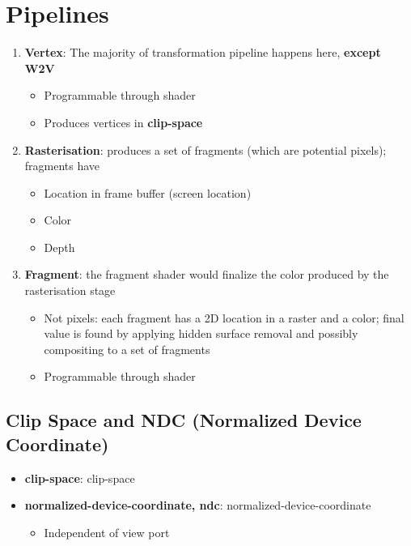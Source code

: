 \chapter{Pipelines}\label{chapter: pipelines}

\begin{enumerate}
  \item \textbf{Vertex}: The majority of transformation pipeline happens here,
  \textbf{except W2V}
  \begin{itemize}
    \item Programmable through shader
    \item Produces vertices in \textbf{\gls{clip-space}}
  \end{itemize}

  \item \textbf{Rasterisation}: produces a set of fragments (which are
  potential pixels); fragments have
  \begin{itemize}
    \item Location in frame buffer (screen location)
    \item Color
    \item Depth
  \end{itemize}

  \item \textbf{Fragment}: the fragment shader would finalize the color
  produced by the rasterisation stage
  \begin{itemize}
    \item Not pixels: each fragment has a 2D location in a raster and a color;
    final value is found by applying hidden surface removal and possibly
    compositing to a set of fragments
    \item Programmable through shader
  \end{itemize}
\end{enumerate}

\section{Clip Space and NDC (Normalized Device Coordinate)}

  \begin{itemize}
    \item \textbf{\Gls{clip-space}}: \glsdesc{clip-space}
    \item \textbf{\Gls{normalized-device-coordinate}, \acrshort{ndc}}:
    \glsdesc{normalized-device-coordinate}
    \begin{itemize}
      \item Independent of view port
    \end{itemize}
  \end{itemize}


